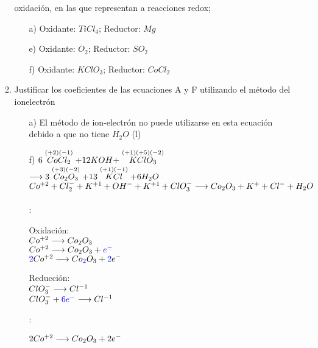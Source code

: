 \documentclass[../practica.root.tex]{subfiles}
\begin{document}
\begin{enumerate}
\begin{enumerate}
                    oxidación, en las que representan a reacciones redox;
                    \begin{enumerate}
                        \item[a)] Oxidante: $TiCl_4$; Reductor: $Mg$
                        \item[e)] Oxidante: $O_2$; Reductor: $SO_2$
                        \item[f)] Oxidante: $KClO_3$; Reductor: $CoCl_2$
                    \end{enumerate}
              \item Justificar los coeficientes de las ecuaciones A y F utilizando el método del ionelectrón
                    \begin{itemize}
                        \item[a)] El método de ion-electrón no puede utilizarse en esta ecuación debido a que no tiene $H_2O$ (l)
                        \item[f)] $6 \stackrel{(+2)(-1)}{CoCl_2} + 12 KOH + \stackrel{(+1)(+5)(-2)}{KClO_3}$
                              $\longrightarrow{} 3 \stackrel{(+3)(-2)}{Co_2O_3} + 13 \stackrel{(+1)(-1)}{KCl} + 6 H_2O$ \\
                              $Co^{+2} + Cl_2^- + K^{+1} + OH^- + K^{+1} + ClO_3^- \longrightarrow{} Co_2O_3 + K^+ + Cl^- + H_2O$ \\ \\
                              :
                              \begin{multicols}{2}
                                  Oxidación: \\
                                  $Co^{+2} \longrightarrow{} Co_2O_3$ \\
                                  $Co^{+2} \longrightarrow{} Co_2O_3 + \textcolor{blue}{e^-}$ \\
                                  $\textcolor{blue}{2} Co^{+2} \longrightarrow{} Co\textcolor{blue}{_2}O_3 + \textcolor{blue}{2}e^-$

                                  \columnbreak

                                  Reducción: \\
                                  $ClO_3^- \longrightarrow{} Cl^{-1}$ \\
                                  $ClO_3^- + \textcolor{blue}{6e^-} \longrightarrow{} Cl^{-1}$
                              \end{multicols}
                              :
                              \begin{multicols}{2}
                                  $2 Co^{+2} \longrightarrow{} Co_2O_3 + 2 e^-$


\end{multicols}
\end{itemize}
\end{enumerate}
\end{enumerate}
\end{document}
